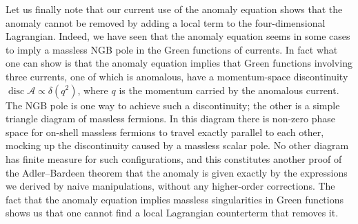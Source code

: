 
Let us finally note that our current use of the anomaly equation shows that
the anomaly cannot be removed by adding a local term to the four-dimensional
Lagrangian. Indeed, we have seen that the anomaly equation seems in some cases
to imply a massless NGB pole in the Green functions of currents. In fact what
one can show \cite{banks-ref-109,banks-ref-110} is that the anomaly equation implies that Green
functions involving three currents, one of which is anomalous, have a
momentum-space discontinuity $\operatorname{disc}\mathcal A\propto\delta(q^2)$,
where $q$ is the momentum carried by the anomalous current. The NGB pole is
one way to achieve such a discontinuity; the other is a simple triangle
diagram of massless fermions. In this diagram there is non-zero phase space
for on-shell massless fermions to travel exactly parallel to each other,
mocking up the discontinuity caused by a massless scalar pole. No other diagram
has finite measure for such configurations, and this constitutes another proof
of the Adler--Bardeen theorem that the anomaly is given exactly by the
expressions we derived by naive manipulations, without any higher-order
corrections. The fact that the anomaly equation implies massless singularities
in Green functions shows us that one cannot find a local Lagrangian counterterm
that removes it.

